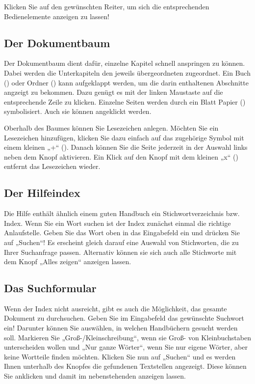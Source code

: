 {Klicken Sie auf den gewünschten Reiter, um sich die entsprechenden
Bedienelemente anzeigen zu lassen!

\subsection{Der Dokumentbaum}

Der Dokumentbaum dient dafür, einzelne Kapitel schnell anspringen zu
können. Dabei werden die Unterkapiteln den jeweils übergeordneten
zugeordnet. Ein Buch () oder Ordner
() kann aufgeklappt werden, um die darin
enthaltenen Abschnitte angzeigt zu bekommen. Dazu genügt es mit der
linken Maustaste auf die entsprechende Zeile zu klicken. Einzelne
Seiten werden durch ein Blatt Papier
() symbolisiert. Auch sie können
angeklickt werden.

Oberhalb des Baumes können Sie Lesezeichen anlegen. Möchten Sie ein
Lesezeichen hinzufügen, klicken Sie dazu einfach auf das zugehörige
Symbol mit einem kleinen „+“
(). Danach können Sie die Seite
jederzeit in der Auswahl links neben dem Knopf aktivieren. Ein Klick
auf den Knopf mit dem kleinen „x“ ()
entfernt das Lesezeichen wieder.

\subsection{Der Hilfeindex}

Die Hilfe enthält ähnlich einem guten Handbuch ein
Stichwortverzeichnis bzw. Index. Wenn Sie ein Wort suchen ist der Index zunächst einmal die richtige Anlaufstelle. Geben Sie das Wort oben in das Eingabefeld ein und drücken Sie auf „Suchen“! Es erscheint gleich darauf eine Auswahl von Stichworten, die zu Ihrer Suchanfrage passen. Alternativ können sie sich auch alle Stichworte mit dem Knopf „Alles zeigen“ anzeigen lassen.

\subsection{Das Suchformular}

Wenn der Index nicht ausreicht, gibt es auch die Möglichkeit, das
gesamte Dokument zu durchsuchen. Geben Sie im Eingabefeld das
gewünschte Suchwort ein! Darunter können Sie auswählen, in welchen
Handbüchern gesucht werden soll. Markieren Sie
„Groß-/Kleinschreibung“, wenn sie Groß- von Kleinbuchstaben
unterscheiden wollen und „Nur ganze Wörter“, wenn Sie nur eigene
Wörter, aber keine Wortteile finden möchten. Klicken Sie nun auf
„Suchen“ und es werden Ihnen unterhalb des Knopfes die gefundenen
Textstellen angezeigt. Diese können Sie anklicken und damit im
nebenstehenden  anzeigen
lassen.

}
